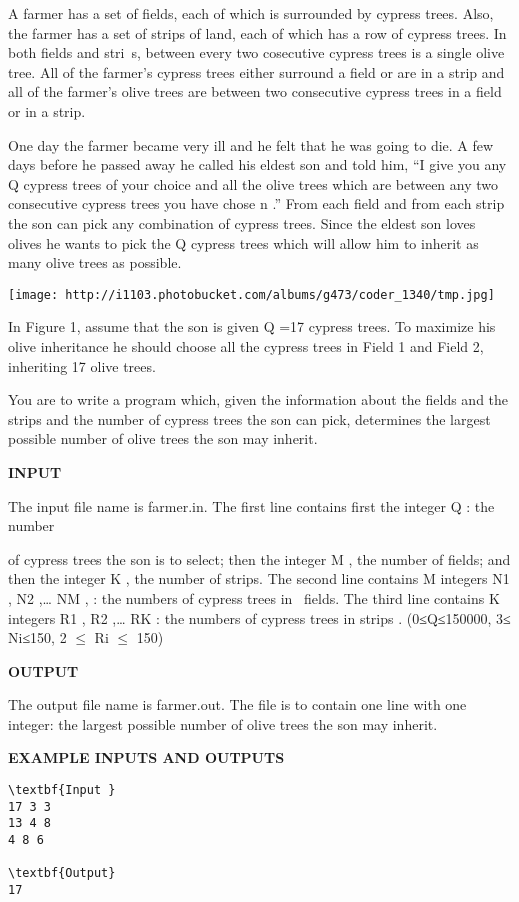 

A farmer has a set of fields, each of which is surrounded by cypress trees. Also, the farmer has a set of strips of land, each of which has a row of cypress trees. In both fields and stri s, between every two cosecutive cypress trees is a single olive tree. All of the farmer’s cypress trees either surround a field or are in a strip and all of the farmer’s olive trees are between two consecutive cypress trees in a field or in a strip.

One day the farmer became very ill and he felt that he was going to die. A few days before he passed away he called his eldest son and told him, “I give you any Q cypress trees of your choice and all the olive trees which are between any two consecutive cypress trees you have chose n .” From each field and from each strip the son can pick any combination of cypress trees. Since the eldest son loves olives he wants to pick the Q cypress trees which will allow him to inherit as many olive trees as possible.


\texttt{[image: http://i1103.photobucket.com/albums/g473/coder\_1340/tmp.jpg]}

In Figure 1, assume that the son is given Q =17 cypress trees. To maximize his olive inheritance he should choose all the cypress trees in Field 1 and Field 2, inheriting 17 olive trees.

You are to write a program which, given the information about the fields and the strips and the number of cypress trees the son can pick, determines the largest possible number of olive trees the son may inherit.

\textbf{INPUT }

The input file name is farmer.in. The first line contains first the integer Q : the number

of cypress trees the son is to select; then the integer M , the number of fields; and then the integer K , the number of strips. The second line contains M integers N1 , N2 ,… NM , : the numbers of cypress trees in  fields. The third line contains K integers R1 , R2 ,… RK : the numbers of cypress trees in strips . (0≤Q≤150000, 3≤ Ni≤150, 2 $\le$  Ri $\le$  150)

\textbf{OUTPUT }

The output file name is farmer.out. The file is to contain one line with one integer: the largest possible number of olive trees the son may inherit.

\textbf{EXAMPLE INPUTS AND OUTPUTS }
\begin{verbatim}
\textbf{Input }
17 3 3
13 4 8
4 8 6

\textbf{Output}
17\end{verbatim}
